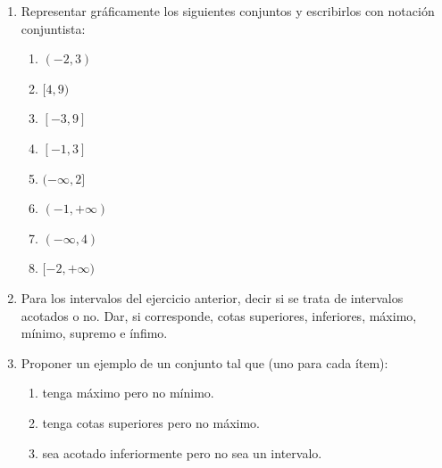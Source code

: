 \documentclass[12pt]{article}
\theoremstyle{definition}
\newtheorem*{remark}{Importante}
\begin{document}
\begin{enumerate}
{{\begin{remark}
Cualquier conjunto que no sea uno de los anteriores no es un intervalo.
\end{remark}
}}
\item  Representar gráficamente los siguientes conjuntos y escribirlos con notación conjuntista: 
\begin{multicols}{3}
\begin{enumerate}
\setlength\itemsep{0em}
\item $(-2,3)$ 
\item $[4,9)$
\item $[-3,9]$
\item $[-1,3]$	
\item $(-\infty,2]$	
\item $(-1, +\infty)$	
\item $(-\infty,4)$
\item $[-2,+\infty)$ 
\end{enumerate}
\end{multicols}

\item  Para los intervalos del ejercicio anterior, decir si se trata de intervalos acotados o no. Dar, si corresponde, cotas superiores, inferiores, máximo, mínimo, supremo e ínfimo.

\item  Proponer un ejemplo de un conjunto tal que (uno para cada ítem):
\begin{enumerate}
\setlength\itemsep{0em}
\item tenga máximo pero no mínimo.
\item tenga cotas superiores pero no máximo. 
\item sea acotado inferiormente pero no sea un intervalo.
\end{enumerate}



\end{enumerate}
\end{document}
